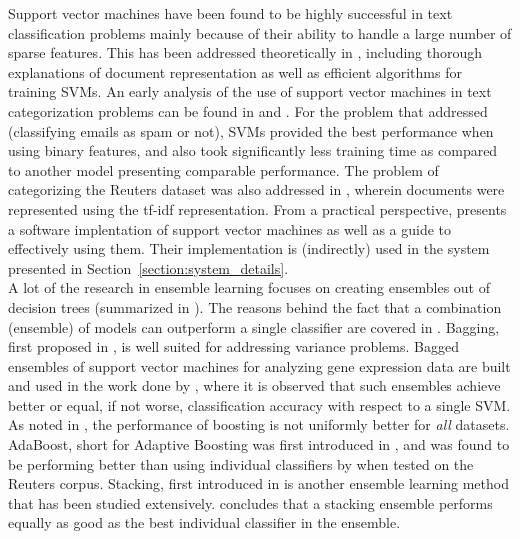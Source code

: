Support vector machines have been found to be highly successful in text classification problems mainly because of their ability to handle a large number of sparse features. This has been addressed theoretically in \cite{joachims2002learning}, including thorough explanations of document representation as well as efficient algorithms for training SVMs. An early analysis of the use of support vector machines in text categorization problems can be found in \cite{joachims1998text} and \cite{drucker1999support}. For the problem that \cite{drucker1999support} addressed (classifying emails as spam or not), SVMs provided the best performance when using binary features, and also took significantly less training time as compared to another model presenting comparable performance. The problem of categorizing the Reuters \cite{reuters} dataset was also addressed in \cite{manevitz2002one}, wherein documents were represented using the tf-idf representation. From a practical perspective, \cite{hsu2003practical} presents a software implentation of support vector machines as well as a guide to effectively using them. Their implementation is (indirectly) used in the system presented in Section~\ref{section:system_details}.\\

A lot of the research in ensemble learning focuses on creating ensembles out of decision trees (summarized in \cite{safavian1991survey}). The reasons behind the fact that a combination (ensemble) of models can outperform a single classifier are covered in \cite{valentini2002ensembles}. Bagging, first proposed in \cite{breiman1996bagging}, is well suited for addressing variance problems. Bagged ensembles of support vector machines for analyzing gene expression data are built and used in the work done by \cite{valentini2003bagged}, where it is observed that such ensembles achieve better or equal, if not worse, classification accuracy with respect to a single SVM. As noted in \cite{bauer1999empirical}, the performance of boosting is not uniformly better for \emph{all} datasets. AdaBoost, short for Adaptive Boosting was first introduced in \cite{freund1999short}, and was found to be performing better than using individual classifiers by \cite{bloehdorn2004text} when tested on the Reuters \cite{reuters} corpus. Stacking, first introduced in \cite{wolpert1992stacked} is another ensemble learning method that has been studied extensively. \cite{dvzeroski2004combining} concludes that a stacking ensemble performs equally as good as the best individual classifier in the ensemble.\\

